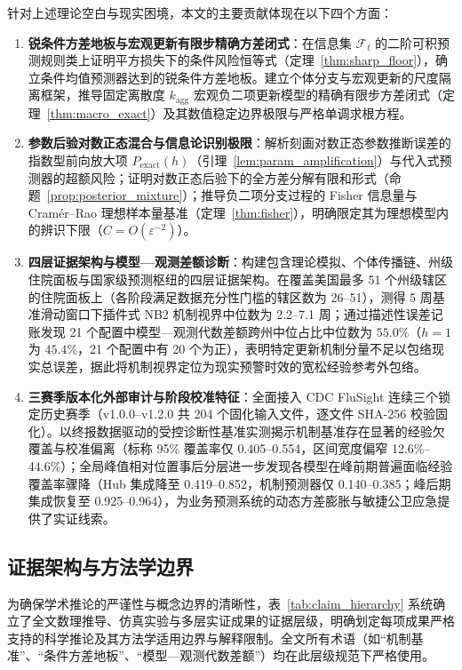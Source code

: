 \documentclass[11pt,a4paper]{article}
\theoremstyle{plain}
\theoremstyle{definition}
\begin{document}
针对上述理论空白与现实困境，本文的主要贡献体现在以下四个方面：
\begin{enumerate}
\item \textbf{锐条件方差地板与宏观更新有限步精确方差闭式}：在信息集 $\mathcal{F}_t$ 的二阶可积预测规则类上证明平方损失下的条件风险恒等式（定理~\ref{thm:sharp_floor}），确立条件均值预测器达到的锐条件方差地板。建立个体分支与宏观更新的尺度隔离框架，推导固定离散度 $k_{\text{agg}}$ 宏观负二项更新模型的精确有限步方差闭式（定理~\ref{thm:macro_exact}）及其数值稳定边界极限与严格单调求根方程。
\item \textbf{参数后验对数正态混合与信息论识别极限}：解析刻画对数正态参数推断误差的指数型前向放大项 $P_{\text{exact}}(h)$（引理~\ref{lem:param_amplification}）与代入式预测器的超额风险；证明对数正态后验下的全方差分解有限和形式（命题~\ref{prop:posterior_mixture}）；推导负二项分支过程的 Fisher 信息量与 Cramér--Rao 理想样本量基准（定理~\ref{thm:fisher}），明确限定其为理想模型内的辨识下限（$C = O(\varepsilon^{-2})$）。
\item \textbf{四层证据架构与模型—观测差额诊断}：构建包含理论模拟、个体传播链、州级住院面板与国家级预测枢纽的四层证据架构。在覆盖美国最多 51 个州级辖区的住院面板上（各阶段满足数据充分性门槛的辖区数为 26--51），测得 5 周基准滑动窗口下插件式 NB2 机制视界中位数为 2.2--7.1 周；通过描述性误差记账发现 21 个配置中模型—观测代数差额跨州中位占比中位数为 $55.0\%$（$h=1$ 为 $45.4\%$，21 个配置中有 20 个为正），表明特定更新机制分量不足以包络现实总误差，据此将机制视界定位为现实预警时效的宽松经验参考外包络。
\item \textbf{三赛季版本化外部审计与阶段校准特征}：全面接入 CDC FluSight 连续三个锁定历史赛季（v1.0.0--v1.2.0 共 204 个固化输入文件，逐文件 SHA-256 校验固化）。以终报数据驱动的受控诊断性基准实测揭示机制基准存在显著的经验欠覆盖与校准偏离（标称 95\% 覆盖率仅 0.405--0.554，区间宽度偏窄 12.6\%--44.6\%）；全局峰值相对位置事后分层进一步发现各模型在峰前期普遍面临经验覆盖率骤降（Hub 集成降至 0.419--0.852，机制预测器仅 0.140--0.385；峰后期集成恢复至 0.925--0.964），为业务预测系统的动态方差膨胀与敏捷公卫应急提供了实证线索。
\end{enumerate}

\subsection{证据架构与方法学边界}\label{sec:claim_hierarchy}

为确保学术推论的严谨性与概念边界的清晰性，表~\ref{tab:claim_hierarchy} 系统确立了全文数理推导、仿真实验与多层实证成果的证据层级，明确划定每项成果严格支持的科学推论及其方法学适用边界与解释限制。全文所有术语（如“机制基准”、“条件方差地板”、“模型—观测代数差额”）均在此层级规范下严格使用。
\end{document}
